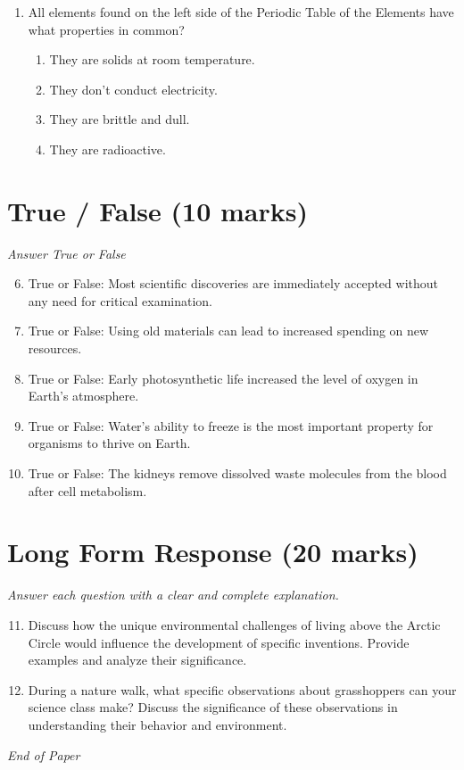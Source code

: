 \documentclass[12pt]{article}
\begin{document}
\begin{enumerate}[label=\arabic*.]
\begin{enumerate}[label=(\alph*)]
    \item observation
    \item measurement
\end{enumerate}
\item All elements found on the left side of the Periodic Table of the Elements have what properties in common?
\begin{enumerate}[label=(\alph*)]
    \item They are solids at room temperature.
    \item They don't conduct electricity.
    \item They are brittle and dull.
    \item They are radioactive.
\end{enumerate}
\end{enumerate}

\section*{True / False (10 marks)}
\textit{Answer True or False}
\begin{enumerate}[label=\arabic*.]
\setcounter{enumi}{5}
\item True or False: Most scientific discoveries are immediately accepted without any need for critical examination.
\item True or False: Using old materials can lead to increased spending on new resources.
\item True or False: Early photosynthetic life increased the level of oxygen in Earth's atmosphere.
\item True or False: Water's ability to freeze is the most important property for organisms to thrive on Earth.
\item True or False: The kidneys remove dissolved waste molecules from the blood after cell metabolism.
\end{enumerate}

\section*{Long Form Response (20 marks)}
\textit{Answer each question with a clear and complete explanation.}
\begin{enumerate}[label=\arabic*.]
\setcounter{enumi}{10}
\item Discuss how the unique environmental challenges of living above the Arctic Circle would influence the development of specific inventions. Provide examples and analyze their significance.
\item During a nature walk, what specific observations about grasshoppers can your science class make? Discuss the significance of these observations in understanding their behavior and environment.
\end{enumerate}

\vfill
\noindent\textit{End of Paper}
\end{document}
